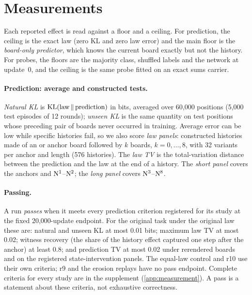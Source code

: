 \section{Measurements}\label{sec:measurements}

Each reported effect is read against a floor and a ceiling. For prediction,
the ceiling is the exact law (zero KL and zero law error) and the main floor
is the \emph{board-only predictor}, which knows the current board exactly
but not the history. For probes, the floors are the majority class,
shuffled labels and the network at update~0, and the ceiling is the same
probe fitted on an exact sums carrier.

\paragraph{Prediction: average and constructed tests.} \emph{Natural KL} is
$\operatorname{KL}(\text{law}\,\|\,\text{prediction})$ in bits, averaged over 60,000
positions (5,000 test episodes of 12 rounds); \emph{unseen KL} is the same
quantity on test positions whose preceding pair of boards never occurred in
training. Average error can be low while specific histories fail, so we also
score \emph{law panels}: constructed histories made of an \Lcat{} or \Hcat{}
anchor board followed by $k$ \Ncat{} boards, $k = 0,\dots,8$, with 32
variants per anchor and length (576 histories). The \emph{law TV} is the
total-variation distance between the prediction and the law at the end of a
history. The \emph{short panel} covers the anchors and
$\mathrm{N}^1$--$\mathrm{N}^2$; the \emph{long panel} covers $\mathrm{N}^3$--$\mathrm{N}^8$.

\paragraph{Passing.} A run \emph{passes} when it meets every prediction
criterion registered for its study at the fixed 20,000-update endpoint. For
the original task under the original law these are: natural and unseen KL at
most 0.01 bits; maximum law TV at most 0.02; witness recovery (the share of
the history effect captured one step after the anchor) at least 0.8; and
prediction TV at most 0.02 under rerendered boards and on the registered
state-intervention panels. The equal-law control and r10 use their own
criteria; r9 and the erosion replays have no pass endpoint. Complete
criteria for every study are in the supplement (\cref{app:measurement}). A pass is a statement about these criteria, not
exhaustive correctness.

